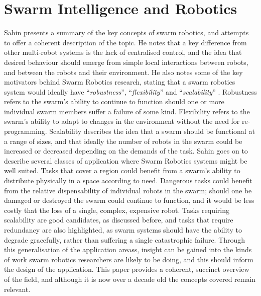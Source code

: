 \section{Swarm Intelligence and Robotics} \label{GeneralSwarmRobotics}
Sahin \cite{Sahin:2004} presents a summary of the key concepts of swarm robotics, and attempts to offer a coherent description of the topic. He notes that a key difference from other multi-robot systems is the lack of centralised control, and the idea that desired behaviour should emerge from simple local interactions between robots, and between the robots and their environment. He also notes some of the key motivators behind Swarm Robotics research, stating that a swarm robotics system would ideally have ``\textit{robustness}'', ``\textit{flexibility}'' and ``\textit{scalability}'' \cite{Sahin:2004}. Robustness refers to the swarm's ability to continue to function should one or more individual swarm members suffer a failure of some kind. Flexibility refers to the swarm's ability to adapt to changes in the environment without the need for re-programming. Scalability describes the idea that a swarm should be functional at a range of sizes, and that ideally the number of robots in the swarm could be increased or decreased depending on the demands of the task. Sahin \cite{Sahin:2004} goes on to describe several classes of application where Swarm Robotics systems might be well suited. Tasks that cover a region could benefit from a swarm's ability to distribute physically in a space according to need. Dangerous tasks could benefit from the relative dispensability of individual robots in the swarm; should one be damaged or destroyed the swarm could continue to function, and it would be less costly that the loss of a single, complex, expensive robot. Tasks requiring scalability are good candidates, as discussed before, and tasks that require redundancy are also highlighted, as swarm systems should have the ability to degrade gracefully, rather than suffering a single catastrophic failure. Through this generalisation of the application areass, insight can be gained into the kinds of work swarm robotics researchers are likely to be doing, and this should inform the design of the application. This paper \cite{Sahin:2004} provides a coherent, succinct overview of the field, and although it is now over a decade old the concepts covered remain relevant.


